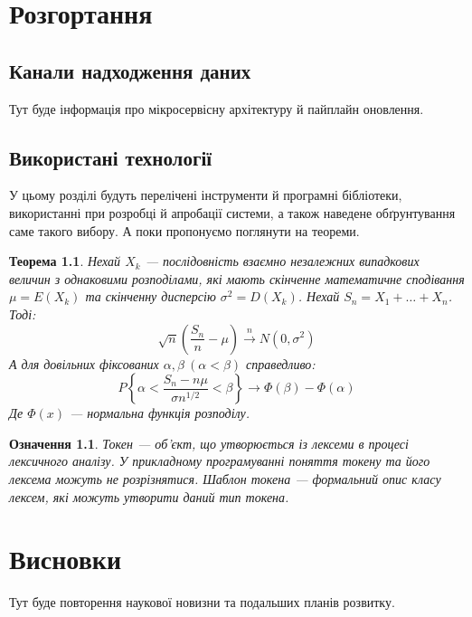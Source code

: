 \documentclass[fleqn,12pt,a4paper]{report}
\numberwithin{equation}{chapter}
\numberwithin{figure}{chapter}
\numberwithin{table}{chapter}
\numberwithin{footnote}{chapter}
\numberwithin{figure}{section}
\newtheorem{theorem}{Теорема}
\newtheorem{definition}{Означення}
\begin{document}
    \newpage


    \chapter{Розгортання}\label{ch:chaper2}


    \section{Канали надходження даних}\label{sec:section2.1}

    Тут буде інформація про мікросервісну архітектуру й пайплайн оновлення.


    \section{Використані технології}\label{sec:section2.2}

    У цьому розділі будуть перелічені інструменти й програмні бібліотеки, використанні при розробці й апробації
    системи, а також наведене обґрунтування саме такого вибору.
    А поки пропонуємо поглянути на теореми.

    \begin{theorem}
        \label{the:central-limit-theorem}
        Нехай $X_{k}$ --- послідовність взаємно незалежних випадкових величин з однаковими розподілами, які мають
        скінченне математичне сподівання $\mu = E(X_{k})$ та скінченну дисперсію $\sigma ^ 2 = D(X_{k})$.
        Нехай $S_{n} = X_{1} + \dots + X_{n}$.
        Тоді:
        \[\sqrt{n} \left(\frac{S_{n}}{n} - \mu\right) \xrightarrow{n} N(0, \sigma ^ 2)\]
        А для довільних фіксованих $\alpha, \beta \ (\alpha < \beta)$ справедливо:
        \[P\left\{\alpha < \frac{S_{n} - n \mu}{\sigma n ^ {1 / 2}} < \beta \right\} \to \Phi(\beta) - \Phi(\alpha)\]
        Де $\Phi(x)$ --- нормальна функція розподілу.
    \end{theorem}

    \begin{definition}
        \label{def:token}
        Токен --- об'єкт, що утворюється із лексеми в процесі лексичного аналізу.
        У прикладному програмуванні поняття токену та його лексема можуть не розрізнятися.
        Шаблон токена --- формальний опис класу лексем, які можуть утворити даний тип токена.
    \end{definition}

    \newpage

    \chapter*{Висновки}

    Тут буде повторення наукової новизни та подальших планів розвитку.

    \printbibliography[title={Список використаних джерел},heading=bibintoc]
\end{document}
